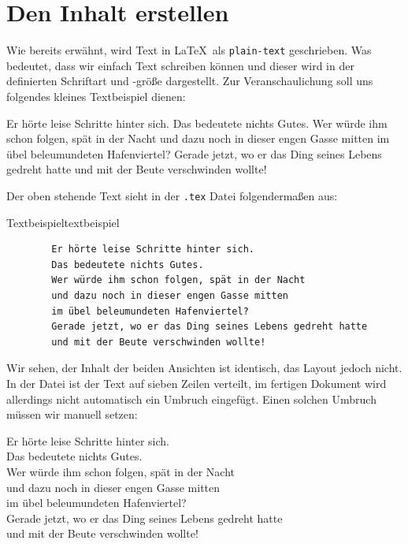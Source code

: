 \section{Den Inhalt erstellen}

Wie bereits erwähnt, wird Text in \LaTeX~als \texttt{plain-text} geschrieben.
Was bedeutet, dass wir einfach Text schreiben können und dieser wird in der
definierten Schriftart und -größe dargestellt. Zur Veranschaulichung soll uns
folgendes kleines Textbeispiel dienen:

Er hörte leise Schritte hinter sich.
Das bedeutete nichts Gutes.
Wer würde ihm schon folgen, spät in der Nacht
und dazu noch in dieser engen Gasse mitten
im übel beleumundeten Hafenviertel?
Gerade jetzt, wo er das Ding seines Lebens gedreht hatte
und mit der Beute verschwinden wollte!

Der oben stehende Text sieht in der \texttt{.tex} Datei folgendermaßen aus:
\begin{code}{Textbeispiel}{textbeispiel}
	\begin{verbatim}
		Er hörte leise Schritte hinter sich. 
		Das bedeutete nichts Gutes. 
		Wer würde ihm schon folgen, spät in der Nacht 
		und dazu noch in dieser engen Gasse mitten 
		im übel beleumundeten Hafenviertel? 
		Gerade jetzt, wo er das Ding seines Lebens gedreht hatte 
		und mit der Beute verschwinden wollte! 
	\end{verbatim}
\end{code}

Wir sehen, der Inhalt der beiden Ansichten ist identisch, das Layout jedoch
nicht. In der Datei ist der Text auf sieben Zeilen verteilt, im fertigen
Dokument wird allerdings nicht automatisch ein Umbruch eingefügt. Einen solchen
Umbruch müssen wir manuell setzen:

Er hörte leise Schritte hinter sich.\\
Das bedeutete nichts Gutes.\\
Wer würde ihm schon folgen, spät in der Nacht\\
und dazu noch in dieser engen Gasse mitten\\
im übel beleumundeten Hafenviertel?\\
Gerade jetzt, wo er das Ding seines Lebens gedreht hatte\\
und mit der Beute verschwinden wollte!

